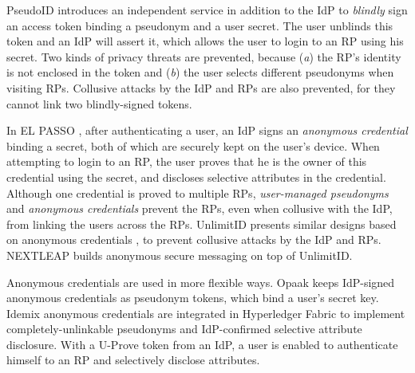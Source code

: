 PseudoID \cite{PseudoID} introduces an independent service in addition to the IdP to \emph{blindly} sign \cite{blind-sign}
    an access token binding a pseudonym and a user secret.
The user unblinds this token and an IdP will assert it,
    which allows the user to login to an RP using his secret.
Two kinds of privacy threats are prevented, because (\emph{a}) the RP's identity is not enclosed in the token
    and (\emph{b}) the user selects different pseudonyms when visiting RPs.
Collusive attacks by the IdP and RPs are also prevented,
    for they cannot link two blindly-signed tokens.




In EL PASSO \cite{ELPASSO}, after authenticating a user,
    an IdP signs an \emph{anonymous credential} \cite{anon-credential} binding a secret,
         both of which are securely kept on the user's device.
When attempting to login to an RP,
    the user proves that he is the owner of this credential using the secret,
        and discloses selective attributes in the credential.
Although one credential is proved to multiple RPs,
        \emph{user-managed pseudonyms} and \emph{anonymous credentials} prevent the RPs, even when collusive with the IdP, from linking the users across the RPs.
UnlimitID \cite{UnlimitID} presents similar designs based on anonymous credentials \cite{anon-credential},
        to prevent collusive attacks by the IdP and RPs.
NEXTLEAP \cite{nextleap} builds anonymous secure messaging on top of UnlimitID.


Anonymous credentials \cite{anon-credential-2001,anon-credential} are used in more flexible ways.
Opaak \cite{Opaak} keeps IdP-signed anonymous credentials %
 as pseudonym tokens,
    which bind a user's secret key.
Idemix anonymous credentials \cite{idemix}
 are integrated in Hyperledger Fabric \cite{hyperledge-idemix} to implement completely-unlinkable pseudonyms
        and IdP-confirmed selective attribute disclosure.
With a U-Prove token \cite{uprov,uprove-conference} from an IdP,
    a user is enabled to authenticate himself to an RP and selectively disclose attributes.

